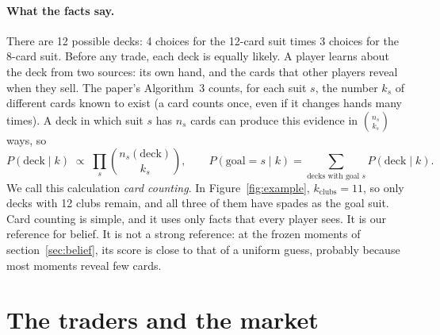 \documentclass[10pt]{article}
\begin{document}
\paragraph{What the facts say.} There are 12 possible decks: 4 choices for the 12-card suit times 3 choices for the
8-card suit. Before any trade, each deck is equally likely. A player learns about the deck from two sources: its own
hand, and the cards that other players reveal when they sell. The paper's Algorithm~3 counts, for each suit $s$, the
number $k_s$ of different cards known to exist (a card counts once, even if it changes hands many times). A deck in which suit $s$ has $n_s$ cards can produce this evidence in
$\binom{n_s}{k_s}$ ways, so
\[
  P(\text{deck} \mid k) \;\propto\; \prod_{s} \binom{n_s(\text{deck})}{k_s},
  \qquad
  P(\text{goal} = s \mid k) = \sum_{\text{decks with goal } s} P(\text{deck} \mid k).
\]
We call this calculation \emph{card counting}. In Figure~\ref{fig:example}, $k_{\text{clubs}} = 11$, so only decks
with 12 clubs remain, and all three of them have spades as the goal suit. Card counting is simple, and it uses only
facts that every player sees. It is our reference for belief. It is not a strong reference: at the frozen moments of
section~\ref{sec:belief}, its score is close to that of a uniform guess, probably because most moments reveal few
cards.

\section{The traders and the market}\label{sec:traders}
\end{document}
